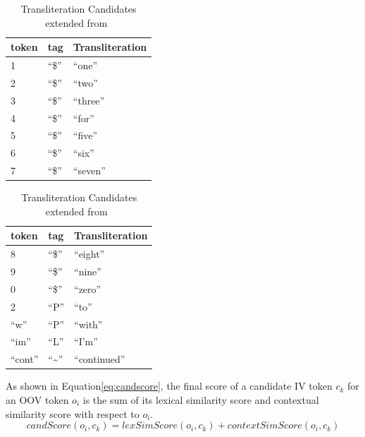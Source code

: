 \documentclass[a4paper,onesided,12pt]{report}
\begin{document}
\begin{table}[ht]
  \caption{Transliteration Candidates extended from~\cite{Gouws:2011:CBL:2021109.2021113}}
  \begin{minipage}[c]{0.5\linewidth}
    \begin{tabular}[l]{lll}
    \hline
    token & tag & Transliteration \\
    \hline
    1 & ``\$'' & ``one'' \\
    2 & ``\$'' & ``two'' \\
    3 & ``\$'' & ``three'' \\
    4 & ``\$'' & ``for'' \\
    5 & ``\$'' & ``five'' \\
    6 & ``\$'' & ``six'' \\
    7 & ``\$'' & ``seven'' \\
    \hline
  \end{tabular}
\end{minipage}
  \begin{minipage}[c]{0.5\linewidth}
    \begin{tabular}[l]{lll}
    \hline
    token & tag & Transliteration \\
    \hline
    8 & ``\$'' & ``eight'' \\
    9 & ``\$'' & ``nine'' \\
    0 & ``\$'' & ``zero'' \\
    2 & ``P''  & ``to'' \\
    ``w'' & ``P''  & ``with'' \\
    ``im'' & ``L''  & ``I'm'' \\
    ``cont'' & ``\textasciitilde''  & ``continued'' \\
    \hline
  \end{tabular}
  \end{minipage}
\label{tab:transliteral}
\end{table}


As shown in Equation\ref{eq:candscore}, the final score of a candidate IV token $c_k$ for an OOV token $o_i$ is the sum of its lexical similarity score and contextual similarity score with respect to $o_i$.
\begin{equation}
candScore(o_i,c_k) = lexSimScore(o_i,c_k) + contextSimScore(o_i,c_k)
\label{eq:candscore}
\end{equation}
\end{document}
